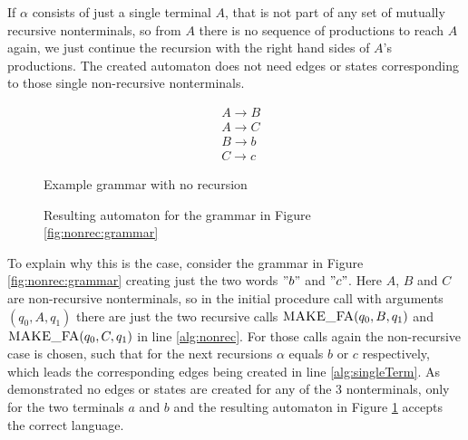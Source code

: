 If $\alpha$ consists of just a single terminal $A$, that is not part of any set of mutually recursive nonterminals, so from $A$ there is no sequence of productions to reach $A$ again, we just continue the recursion with the right hand sides of $A$'s productions. The created automaton does not need edges or states corresponding to those single non-recursive nonterminals. 


\begin{figure}[!h]
	\begin{minipage}[b]{.45\linewidth}
		\begin{align*}
			&A \rightarrow B\\
			&A \rightarrow C\\
			&B \rightarrow b\\
			&C \rightarrow c
		\end{align*}
		\caption{Example grammar with no recursion}
		\label{fig:nonrec:grammar}
	\end{minipage}
	\hfill
	\begin{minipage}[b]{.45\linewidth}
		\caption{Resulting automaton for the grammar in Figure \ref{fig:nonrec:grammar}}
		\label{fig:nonrec:automaton}
	\end{minipage}
\end{figure}


To explain why this is the case, consider the grammar in Figure \ref{fig:nonrec:grammar} creating just the two words $"b"$ and $"c"$. Here $A$, $B$ and $C$ are non-recursive nonterminals, so in the initial procedure call with arguments $(q_0, A, q_1)$ there are just the two recursive calls $\textproc{MAKE\_FA}(q_0, B, q_1)$ and $\textproc{MAKE\_FA}(q_0, C, q_1)$ in line \ref{alg:nonrec}. For those calls again the non-recursive case is chosen, such that for the next recursions $\alpha$ equals $b$ or $c$ respectively, which leads the corresponding edges being created in line \ref{alg:singleTerm}. As demonstrated no edges or states are created for any of the 3 nonterminals, only for the two terminals $a$ and $b$ and the resulting automaton in Figure \ref{fig:nonrec:automaton} accepts the correct language.

